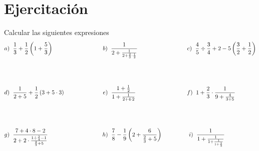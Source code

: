 \documentclass{article}
\begin{document}
\section*{Ejercitación}
\noindent Calcular las siguientes expresiones
\begin{align*}
    & a)\hspace{2mm}\frac{1}{3}+\frac{1}{2}\left(1+\frac{5}{3}\right)\hspace{3cm}
    b)\hspace{2mm}\frac{1}{2+\frac{1}{2+\frac{2}{3}\cdot\frac{1}{2}}}\hspace{3cm}
    c)\hspace{2mm}\frac{4}{5}\div\frac{3}{4}+2-5\left(\frac{3}{2}+\frac{1}{2}\right) \\[1.5cm]
    & d)\hspace{2mm}\frac{1}{2+5}+\frac{1}{2}\left(3+5\cdot3\right)\hspace{2.3cm}
    e)\hspace{2mm}\frac{1+\frac{1}{2}}{1+\frac{1}{2+4\cdot2}}\hspace{3.1cm}
    f)\hspace{2mm}1+\frac{2}{3}\cdot\frac{1}{9+\frac{4}{3+5}} \\[1.5cm]
    & g)\hspace{2mm}\frac{7+4\cdot8-2}{2+2\cdot\frac{1\div\frac{3}{4}-1}{\frac{2}{3}+5}}
    \hspace{3.3cm}
    h)\hspace{2mm}\frac{7}{8}-\frac{1}{9}\left(2+\frac{6}{\frac{2}{3}+5}\right)\hspace{1.6cm}
    i)\hspace{2mm}\frac{1}{1+\frac{1}{1+\frac{1}{1+\frac{1}{3}}}}
\end{align*}
\end{document}
